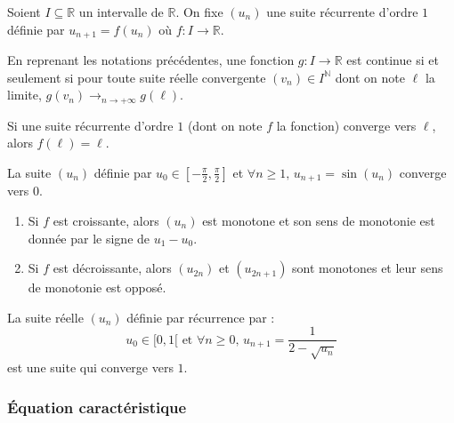 
  Soient $I \subseteq \mathbb{R}$ un intervalle de $\mathbb{R}$. On fixe $(u_n)$ une suite récurrente d'ordre $1$ définie par $u_{n+1} = f(u_n)$ où $f : I \rightarrow \mathbb{R}$.

  \begin{theorem}
    En reprenant les notations précédentes, une fonction $g : I \rightarrow \mathbb{R}$ est continue si et seulement si pour toute suite réelle convergente $(v_n) \in I^{\mathbb{N}}$ dont on note $\ell$ la limite, $g(v_n) \longrightarrow_{n \rightarrow +\infty} g(\ell)$.
  \end{theorem}

  \begin{corollary}
    Si une suite récurrente d'ordre $1$ (dont on note $f$ la fonction) converge vers $\ell$, alors $f(\ell) = \ell$.
  \end{corollary}

  \begin{example}
    La suite $(u_n)$ définie par $u_0 \in \left[ -\frac{\pi}{2}, \frac{\pi}{2} \right]$ et $\forall n \geq 1, \, u_{n+1} = \sin(u_n)$ converge vers $0$.
  \end{example}


  \begin{proposition}
    \begin{enumerate}[label={\bfseries(\roman*)}]
      \item Si $f$ est croissante, alors $(u_n)$ est monotone et son sens de monotonie est donnée par le signe de $u_1 - u_0$.
      \item Si $f$ est décroissante, alors $(u_{2n})$ et $(u_{2n+1})$ sont monotones et leur sens de monotonie est opposé.
    \end{enumerate}
  \end{proposition}

  \begin{example}
    La suite réelle $(u_n)$ définie par récurrence par :
    \[ u_0 \in [0, 1[ \text{ et } \forall n \geq 0, \, u_{n+1} = \frac{1}{2 - \sqrt{u_n}} \]
    est une suite qui converge vers $1$.
  \end{example}

  \subsubsection{Équation caractéristique}

